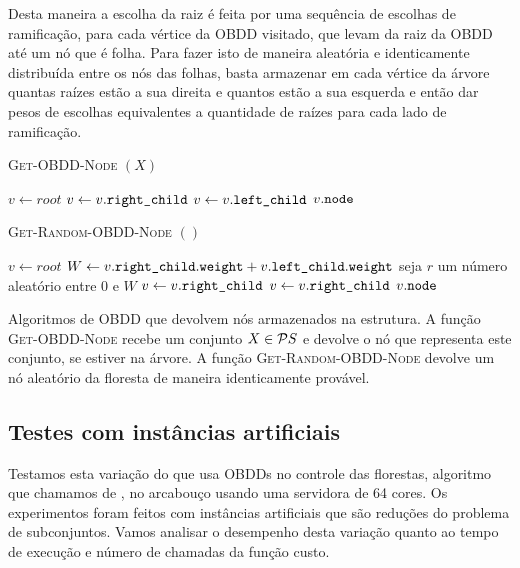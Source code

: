 Desta maneira a escolha da raiz é feita por uma sequência de escolhas
de ramificação, para cada vértice da OBDD visitado, que levam da raiz
da OBDD até um nó que é folha. Para fazer isto de maneira aleatória e
identicamente distribuída entre os nós das folhas, basta armazenar em
cada vértice da árvore quantas raízes estão a sua direita e quantos 
estão a sua esquerda e então dar pesos de escolhas equivalentes a
quantidade de raízes para cada lado de ramificação.

\begin{algorithm}[H]
\textsc{Get-OBDD-Node} $(X)$
\begin{algorithmic}[1]
    \State $v \gets root$
            \State $v \gets v.\texttt{right\_child}$
        \Else
            \State $v \gets v.\texttt{left\_child}$
        \EndIf
    \EndWhile
    \Return $v.\texttt{node}$
\end{algorithmic}
\vspace{1em}
\textsc{Get-Random-OBDD-Node} $()$
\begin{algorithmic}[1]
    \State $v \gets root$
        \State $W \gets v.\texttt{right\_child}.\texttt{weight} + v.\texttt{left\_child}.\texttt{weight}$
        \State seja $r$ um número aleatório entre 0 e $W$
            \State $v \gets v.\texttt{right\_child}$
        \Else
            \State $v \gets v.\texttt{right\_child}$
        \EndIf
    \EndWhile
    \Return $v.\texttt{node}$
\end{algorithmic}
\caption{Algoritmos de OBDD que devolvem nós armazenados na estrutura.
A função \textsc{Get-OBDD-Node} recebe um conjunto $X \in \mathcal{P}{S}$
e devolve o nó que representa este conjunto, se estiver na árvore. A 
função \textsc{Get-Random-OBDD-Node} devolve um nó aleatório da floresta
de maneira identicamente provável.}
\end{algorithm}

\subsection{Testes com instâncias artificiais}
Testamos esta variação do  que usa OBDDs no controle
das florestas, algoritmo que chamamos de , no arcabouço
 usando uma servidora de 64 cores. Os experimentos
foram feitos com instâncias artificiais que são reduções do problema de
subconjuntos. Vamos analisar o desempenho desta variação quanto ao tempo
de execução e número de chamadas da função custo.

